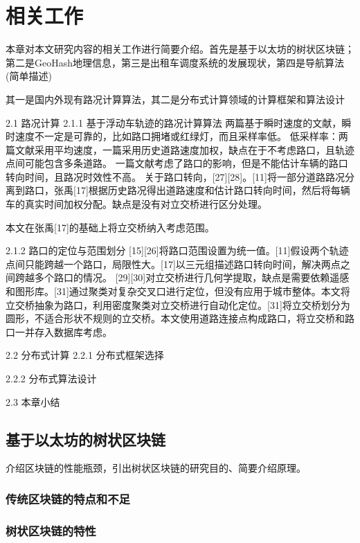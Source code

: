 \chapter{相关工作}
本章对本文研究内容的相关工作进行简要介绍。首先是基于以太坊的树状区块链；第二是GeoHash地理信息，第三是出租车调度系统的发展现状，第四是导航算法(简单描述)

其一是国内外现有路况计算算法，其二是分布式计算领域的计算框架和算法设计

2.1 路况计算
2.1.1 基于浮动车轨迹的路况计算算法
两篇基于瞬时速度的文献，瞬时速度不一定是可靠的，比如路口拥堵或红绿灯，而且采样率低。
低采样率：两篇文献采用平均速度，一篇采用历史道路速度加权，缺点在于不考虑路口，且轨迹点间可能包含多条道路。
一篇文献考虑了路口的影响，但是不能估计车辆的路口转向时间，且路况时效性不高。
关于路口转向，[27][28]。[11]将一部分道路路况分离到路口，张禹[17]根据历史路况得出道路速度和估计路口转向时间，然后将每辆车的真实时间加权分配。缺点是没有对立交桥进行区分处理。

本文在张禹[17]的基础上将立交桥纳入考虑范围。

2.1.2 路口的定位与范围划分
[15][26]将路口范围设置为统一值。[11]假设两个轨迹点间只能跨越一个路口，局限性大。[17]以三元组描述路口转向时间，解决两点之间跨越多个路口的情况。
[29][30]对立交桥进行几何学提取，缺点是需要依赖遥感和图形库。[31]通过聚类对复杂交叉口进行定位，但没有应用于城市整体。本文将立交桥抽象为路口，利用密度聚类对立交桥进行自动化定位。[31]将立交桥划分为圆形，不适合形状不规则的立交桥。本文使用道路连接点构成路口，将立交桥和路口一并存入数据库考虑。

2.2 分布式计算
2.2.1 分布式框架选择

2.2.2 分布式算法设计

2.3 本章小结


\section{基于以太坊的树状区块链}
介绍区块链的性能瓶颈，引出树状区块链的研究目的、简要介绍原理。
\subsection{传统区块链的特点和不足}
\subsection{树状区块链的特性}

